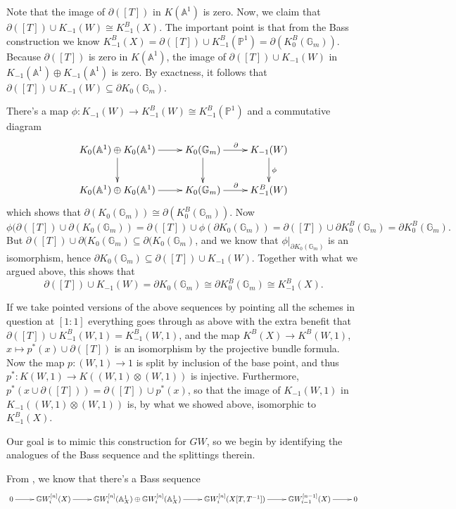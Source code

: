 \documentclass[draftthesis,tocnosub,noragright,centerchapter,10pt]{uiucthesis2009}
\newcommand{\mbb}{\mathbb}
\theoremstyle{plain}
\theoremstyle{definition}
\begin{document}
Note that the image of $\partial([T])$ in $K(\mbb A^1)$ is zero. Now,
we claim that $\partial([T]) \cup K_{-1}(W) \cong K^B_{-1}(X)$. The
important point is that from the Bass construction we know 
$K^B_{-1}(X) = \partial([T]) \cup K^B_{-1}(\mbb P^1)
= \partial(K^B_0(\mbb G_m))$. Because $\partial([T])$ is zero in
$K(\mbb A^1)$, the image of $\partial([T]) \cup K_{-1}(W)$ in
$K_{-1}(\mbb A^1) \oplus K_{-1}(\mbb A^1)$ is zero. By exactness, it follows that
$\partial([T]) \cup K_{-1}(W)  \subseteq  \partial K_0(\mbb G_m)$. 

There's a map $\phi : K_{-1}(W) \rightarrow K_{-1}^B(W) \cong
K_{-1}^B(\mbb P^1)$ and a commutative diagram
\[
\xymatrix{K_0(\mbb A^1) \oplus K_0(\mbb A^1) \ar[r] \ar[d] & K_0(\mbb
  G_m) \ar[r]^\partial \ar[d] & K_{-1}(W) \ar[d]^\phi\\
K_0(\mbb A^1) \oplus K_0(\mbb A^1) \ar[r] & K_0(\mbb
  G_m) \ar[r]^\partial & K_{-1}^B(W)
}
\]
which shows that $\partial(K_0(\mbb
  G_m)) \cong \partial(K_0^B(\mbb
  G_m))$. Now 
\[
\phi(\partial([T]) \cup \partial(K_{0}(\mbb G_m)) = \partial([T]) \cup
  \phi(\partial K_{0}(\mbb G_m)) = \partial([T]) \cup \partial
  K_{0}^B(\mbb G_m) = \partial K_0^B(\mbb G_m).
\]
But $\partial([T]) \cup \partial(K_{0}(\mbb G_m)
\subseteq \partial(K_{0}(\mbb G_m)$, and we know that $\phi|_{\partial K_0(\mbb G_m)}$ is an isomorphism,
hence $\partial
K_0(\mbb G_m) \subseteq \partial([T]) \cup K_{-1}(W)$. Together with what we argued above, this shows that
\[
\partial([T]) \cup K_{-1}(W) = \partial K_0(\mbb G_m) \cong \partial
K_0^B(\mbb G_m) \cong K_{-1}^B(X).
\]

If we take pointed versions of the above sequences by pointing all the
schemes in question at $[1:1]$ everything goes through as above with
the extra benefit that $\partial([T]) \cup K^B_{-1}(W,1) =
K^B_{-1}(W,1)$, and the map $K^B(X) \rightarrow K^B(W,1)$, $x \mapsto
p^*(x) \cup \partial([T])$ is an isomorphism by the projective bundle
formula. Now the map $p : (W,1) \rightarrow 1$ is split by inclusion
of the base point, and thus $p^* : K(W,1) \rightarrow K((W,1) \otimes
(W,1))$ is injective. Furthermore, $p^*(x \cup \partial([T]))
= \partial([T]) \cup p^*(x)$, so that the image of $K_{-1}(W,1)$ in
$K_{-1}((W,1) \otimes (W,1))$ is, by what we showed above, isomorphic
to $K^B_{-1}(X)$. 

Our goal is to mimic this construction for $GW$, so we begin by
identifying the analogues of the Bass sequence and the splittings
therein.

From \cite{Schder}, we know that there's a Bass sequence
\[
\xymatrix{0 \ar[r] & \mbb GW^{[n]}_i(X) \ar[r] & \mbb GW^{[n]}_i(\mbb
  A^1_X) \oplus \mbb GW^{[n]}_i(\mbb A^1_X) \ar[r] & \mbb
  GW^{[n]}_i(X[T,T^{-1}]) \ar[r] & \mbb GW^{[n-1]}_{i-1}(X) \ar[r] & 0}
\]
\end{document}
